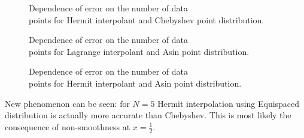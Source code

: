 \documentclass[10pt]{article}
\begin{document}
\begin{figure}[H]
\begin{minipage}[h]{0.45\linewidth}
			\caption{Dependence of error on the number of data\\ points for Hermit interpolant and Chebyshev point distribution.}
		\end{minipage}%
		\vfill
		\begin{minipage}[h]{0.45\linewidth}
			\caption{Dependence of error on the number of data\\ points for Lagrange interpolant and Asin point distribution.}
		\end{minipage}%
		\hspace{0.5cm}
		\begin{minipage}[h]{0.45\linewidth}
			\caption{Dependence of error on the number of data\\ points for Hermit interpolant and Asin point distribution.}
		\end{minipage}%
	\end{figure}
 New phenomenon can be seen: for $N=5$ Hermit interpolation using Equispaced distribution is actually more accurate than Chebyshev. This is most likely the consequence of non-smoothness at $x=\frac{1}{2}$.
	\newpage
\end{document}

